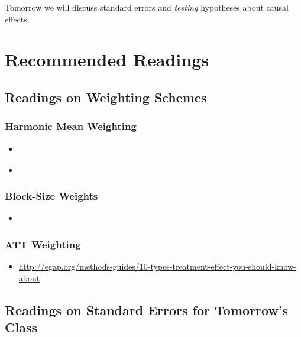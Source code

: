 \documentclass[11pt,leqno]{article}\usepackage[]{graphicx}\usepackage[]{color}
\theoremstyle{newstyle}
\begin{document}
Tomorrow we will discuss standard errors and \textit{testing} hypotheses about causal effects.

\section{Recommended Readings}

\subsection{Readings on Weighting Schemes}

\subsubsection{Harmonic Mean Weighting}

\begin{itemize}

\item \citet[Section 9.3.3]{hansen2011}

\item \citet[Section 2.1]{hansenbowers2008}

\end{itemize}

\subsubsection{Block-Size Weights}

\begin{itemize}

\item \citet[Section 3.6.1]{gerbergreen2012}

\end{itemize}

\subsubsection{ATT Weighting}

\begin{itemize}

\item
	\url{http://egap.org/methods-guides/10-types-treatment-effect-you-should-know-about}

\end{itemize}

\subsection{Readings on Standard Errors for Tomorrow's Class}
\end{document}
